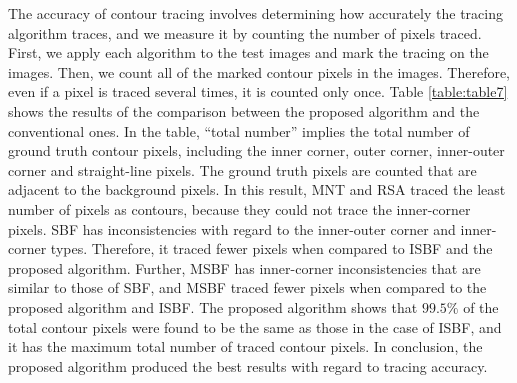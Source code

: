 \documentclass[sensors,article,accept,moreauthors,pdftex,10pt,a4paper]{mdpi}
\begin{document}
The accuracy of contour tracing involves determining how accurately the tracing algorithm traces, and we measure it by counting the number of pixels traced. First, we apply each algorithm to the test images and mark the tracing on the images. Then, we count all of the marked contour pixels in the images. Therefore, even if a pixel is traced several times, it is counted only once. Table \ref{table:table7} shows the results of the comparison between the proposed algorithm and the conventional ones. In the table, ``total number'' implies the total number of ground truth contour pixels, including the inner corner, outer corner, inner-outer corner and straight-line pixels. The ground truth pixels are counted that are adjacent to the background pixels. In this result, MNT and RSA traced the least number of pixels as contours, because they could not trace the inner-corner pixels. SBF has inconsistencies with regard to the inner-outer corner and inner-corner types. Therefore, it traced fewer pixels when compared to ISBF and the proposed algorithm. Further, MSBF has inner-corner inconsistencies that are similar to those of SBF, and MSBF traced fewer pixels when compared to the proposed algorithm and ISBF. The proposed algorithm shows that $99.5\%$ of the total contour pixels were found to be the same as those in the case of ISBF, and it has the maximum total number of traced contour pixels. In conclusion, the proposed algorithm produced the best results with regard to tracing accuracy.
\end{document}
